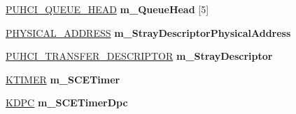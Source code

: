 \begin{DoxyCompactItemize}
\hyperlink{struct___u_h_c_i___q_u_e_u_e___h_e_a_d}{P\+U\+H\+C\+I\+\_\+\+Q\+U\+E\+U\+E\+\_\+\+H\+E\+AD} {\bfseries m\+\_\+\+Queue\+Head} \mbox{[}5\mbox{]}
\item 
\mbox{\label{class_c_u_s_b_hardware_device_a0a7b8e0a5c586e7a978061737330aff8}} 
\hyperlink{union___l_a_r_g_e___i_n_t_e_g_e_r}{P\+H\+Y\+S\+I\+C\+A\+L\+\_\+\+A\+D\+D\+R\+E\+SS} {\bfseries m\+\_\+\+Stray\+Descriptor\+Physical\+Address}
\item 
\mbox{\label{class_c_u_s_b_hardware_device_aacaa70d1a2d65221a30bfc0cd9c61f3c}} 
\hyperlink{struct___u_h_c_i___t_r_a_n_s_f_e_r___d_e_s_c_r_i_p_t_o_r}{P\+U\+H\+C\+I\+\_\+\+T\+R\+A\+N\+S\+F\+E\+R\+\_\+\+D\+E\+S\+C\+R\+I\+P\+T\+OR} {\bfseries m\+\_\+\+Stray\+Descriptor}
\item 
\mbox{\label{class_c_u_s_b_hardware_device_aa6d17692666c161d12f2888e953d3f16}} 
\hyperlink{struct___k_t_i_m_e_r}{K\+T\+I\+M\+ER} {\bfseries m\+\_\+\+S\+C\+E\+Timer}
\item 
\mbox{\label{class_c_u_s_b_hardware_device_aae00474a00c13f8ee8d7327ca666a4fd}} 
\hyperlink{struct___k_d_p_c}{K\+D\+PC} {\bfseries m\+\_\+\+S\+C\+E\+Timer\+Dpc}
\end{DoxyCompactItemize}
